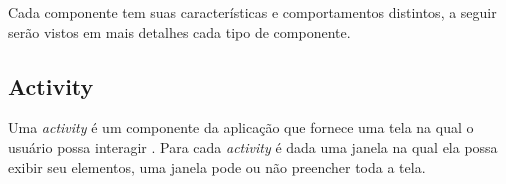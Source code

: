   Cada componente tem suas características e comportamentos distintos, a seguir serão vistos em mais
  detalhes cada tipo de componente.

\subsection{Activity}
 Uma \textit{activity} é um componente da aplicação que fornece uma tela na qual o usuário possa interagir \cite{activity}.
 Para cada \textit{activity} é dada uma janela na qual ela possa exibir seu elementos, uma janela pode ou não preencher toda a tela. 
 
